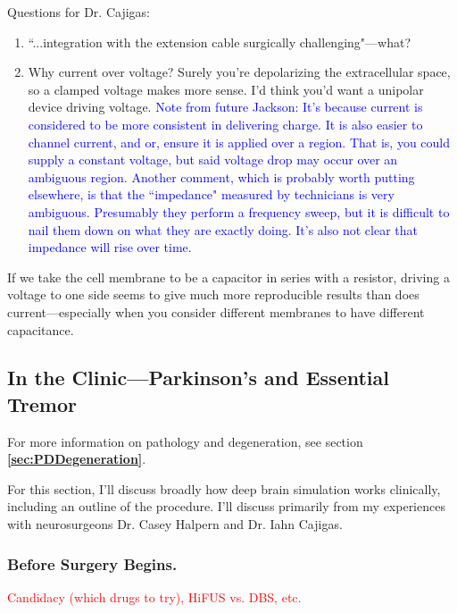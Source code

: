 \color{red}
Questions for Dr. Cajigas:
\begin{enumerate}
    \itemsep 0em
    \item ``...integration with the extension cable surgically challenging"---what?
    \item Why current over voltage? Surely you're depolarizing the extracellular space, so a clamped voltage makes more sense. I'd think you'd want a unipolar device driving voltage.
    \textcolor{blue}{Note from future Jackson: It's because current is considered to be more consistent in delivering charge. It is also easier to channel current, and or, ensure it is applied over a region. That is, you could supply a constant voltage, but said voltage drop may occur over an ambiguous region. Another comment, which is probably worth putting elsewhere, is that the ``impedance" measured by technicians is very ambiguous. Presumably they perform a frequency sweep, but it is difficult to nail them down on what they are exactly doing. It's also not clear that impedance will rise over time. }
\end{enumerate}
If we take the cell membrane to be a capacitor in series with a resistor, driving a voltage to one side seems to give much more reproducible results than does current---especially when you consider different membranes to have different capacitance. 


\color{black}

\subsection{In the Clinic---Parkinson's and Essential Tremor}

For more information on pathology and degeneration, see section \textbf{\ref{sec:PDDegeneration}}.\newline

For this section, I'll discuss broadly how deep brain simulation works clinically, including an outline of the procedure. I'll discuss primarily from my experiences with neurosurgeons Dr. Casey Halpern and Dr. Iahn Cajigas.\newline



\subsubsection{Before Surgery Begins.}

\textcolor{red}{Candidacy (which drugs to try), HiFUS vs. DBS, etc. }


